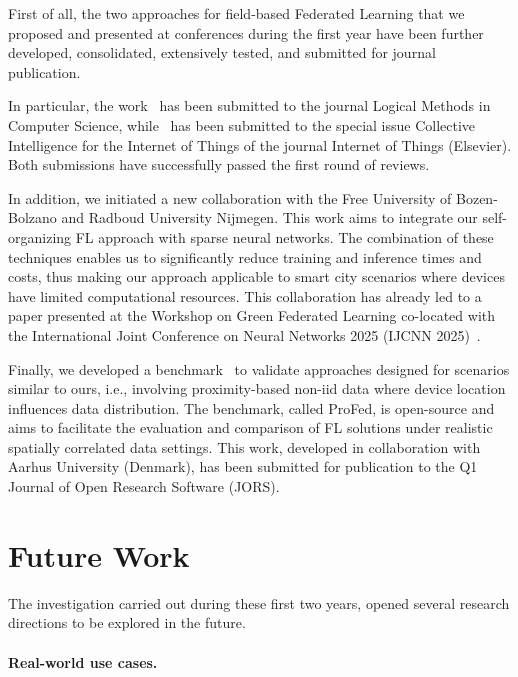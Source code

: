 \documentclass[runningheads]{llncs}
\begin{document}
First of all, the two approaches for field-based Federated Learning that we proposed and presented 
 at conferences during the first year have been further developed, consolidated, extensively tested, 
 and submitted for journal publication. 
 
In particular, the work~\cite{DBLP:conf/coordination/DominiAEV24}
 has been submitted to the journal Logical Methods in Computer Science, 
 while~\cite{DBLP:conf/acsos/DominiFAVE24} has been submitted to the special issue
 Collective Intelligence for the Internet of Things of the journal Internet of Things (Elsevier). 
% 
Both submissions have successfully passed the first round of reviews.

In addition, we initiated a new collaboration with the Free University of Bozen-Bolzano 
 and Radboud University Nijmegen. 
%
This work aims to integrate our self-organizing FL approach with sparse neural networks. 
%
The combination of these techniques enables us to significantly reduce training and inference times and costs, 
 thus making our approach applicable to smart city scenarios where devices have limited computational resources. 
%
This collaboration has already led to a paper presented at the Workshop on Green Federated Learning 
 co-located with the International Joint Conference on Neural Networks 2025 (IJCNN 2025)~\cite{DBLP:journals/corr/abs-2507-07613}.

Finally, we developed a benchmark~\cite{DBLP:journals/corr/abs-2503-20618} to validate approaches designed for scenarios similar to ours, 
 i.e., involving proximity-based non-iid data where device location influences data distribution. 
% 
The benchmark, called ProFed, is open-source and aims to facilitate the evaluation and comparison 
 of FL solutions under realistic spatially correlated data settings. 
% 
This work, developed in collaboration with Aarhus University (Denmark), 
 has been submitted for publication to the Q1 Journal of Open Research Software (JORS).

\section{Future Work}\label{sec:future}

The investigation carried out during these first two years, opened several research directions
 to be explored in the future.

\paragraph{Real-world use cases.}
\end{document}
